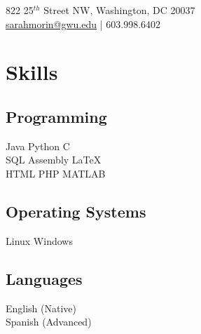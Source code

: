 \documentclass[]{deedy-resume-openfont}
\begin{document}
%
%
\lastupdated

%
%
{   822 25$^{th}$ Street NW, Washington, DC 20037 \\
\href{mailto:sarahmorin@gwu.edu}{sarahmorin@gwu.edu} | 603.998.6402 }

%
%

\begin{minipage}[t]{0.33\textwidth}

        \section{Skills}
        \subsection{Programming}
        Java \textbullet{}  Python \textbullet{} C \\
        SQL \textbullet{} Assembly \textbullet{} \LaTeX\ \\
        HTML \textbullet{} PHP \textbullet{} MATLAB \\
        \sectionsep
        \subsection{Operating Systems}
        Linux \textbullet{} Windows \\
        \sectionsep
        \subsection{Languages}
        English (Native) \\
        Spanish (Advanced)\\
        \sectionsep



\end{minipage}
\end{document}
